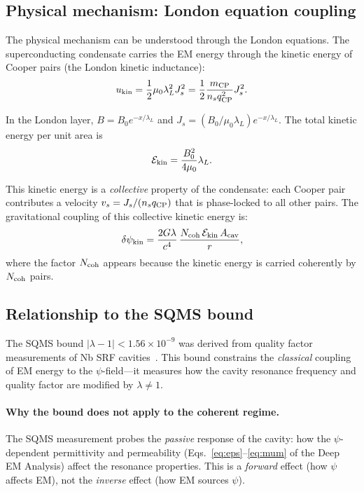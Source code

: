 \documentclass[12pt,aps,prd,twocolumn,superscriptaddress,nofootinbib]{revtex4-2}
\newcommand{\psifield}{\psi}
\newcommand{\lam}{\lambda}
\newcommand{\ee}[1]{\times 10^{#1}}
\begin{document}
\subsection{Physical mechanism: London equation coupling}

The physical mechanism can be understood through the London equations.
The superconducting condensate carries the EM energy through the
kinetic energy of Cooper pairs (the London kinetic inductance):
\begin{equation}\label{eq:London-KE}
u_{\rm kin} = \frac{1}{2}\mu_0\lambda_L^2 J_s^2
= \frac{1}{2}\frac{m_{\rm CP}}{n_s q_{\rm CP}^2}J_s^2.
\end{equation}

In the London layer, $B = B_0 e^{-x/\lambda_L}$ and
$J_s = (B_0/\mu_0\lambda_L)e^{-x/\lambda_L}$. The total kinetic
energy per unit area is
\begin{equation}\label{eq:KE-total}
\mathcal{E}_{\rm kin} = \frac{B_0^2}{4\mu_0}\lambda_L.
\end{equation}

This kinetic energy is a \emph{collective} property of the condensate:
each Cooper pair contributes a velocity $v_s = J_s/(n_s q_{\rm CP})$
that is phase-locked to all other pairs. The gravitational coupling
of this collective kinetic energy is:
\begin{equation}\label{eq:grav-KE}
\delta\psifield_{\rm kin} = \frac{2G\lam}{c^4}\,
\frac{N_{\rm coh}\,\mathcal{E}_{\rm kin}\,A_{\rm cav}}{r},
\end{equation}
where the factor $N_{\rm coh}$ appears because the kinetic energy is
carried coherently by $N_{\rm coh}$ pairs.

\subsection{Relationship to the SQMS bound}

The SQMS bound $|\lam-1| < 1.56\ee{-9}$ was derived from quality
factor measurements of Nb SRF cavities~\cite{Alcock2025SQMS}. This
bound constrains the \emph{classical} coupling of EM energy to the
$\psi$-field---it measures how the cavity resonance frequency and
quality factor are modified by $\lam \neq 1$.

\paragraph{Why the bound does not apply to the coherent regime.}
The SQMS measurement probes the \emph{passive} response of the cavity:
how the $\psi$-dependent permittivity and permeability
(Eqs.~\eqref{eq:eps}--\eqref{eq:mum} of the Deep EM Analysis) affect
the resonance properties. This is a \emph{forward} effect (how $\psi$
affects EM), not the \emph{inverse} effect (how EM sources $\psi$).
\end{document}
